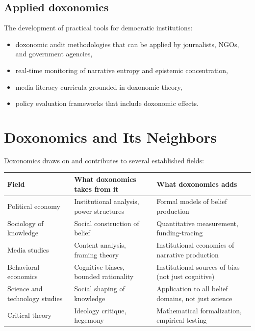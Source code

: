 \subsection{Applied doxonomics}

The development of practical tools for democratic institutions:
\begin{itemize}[nosep]
  \item doxonomic audit methodologies that can be applied by journalists, NGOs, and government agencies,
  \item real-time monitoring of narrative entropy and epistemic concentration,
  \item media literacy curricula grounded in doxonomic theory,
  \item policy evaluation frameworks that include doxonomic effects.
\end{itemize}

\section{Doxonomics and Its Neighbors}
\label{sec:ch35-neighbors}

Doxonomics draws on and contributes to several established fields:

\begin{center}
\begin{tabular}{p{3.5cm}p{4cm}p{4.5cm}}
\toprule
Field & What doxonomics takes from it & What doxonomics adds \\
\midrule
Political economy & Institutional analysis, power structures & Formal models of belief production \\[4pt]
Sociology of knowledge & Social construction of belief & Quantitative measurement, funding-tracing \\[4pt]
Media studies & Content analysis, framing theory & Institutional economics of narrative production \\[4pt]
Behavioral economics & Cognitive biases, bounded rationality & Institutional sources of bias (not just cognitive) \\[4pt]
Science and technology studies & Social shaping of knowledge & Application to all belief domains, not just science \\[4pt]
Critical theory & Ideology critique, hegemony & Mathematical formalization, empirical testing \\
\bottomrule
\end{tabular}
\end{center}

